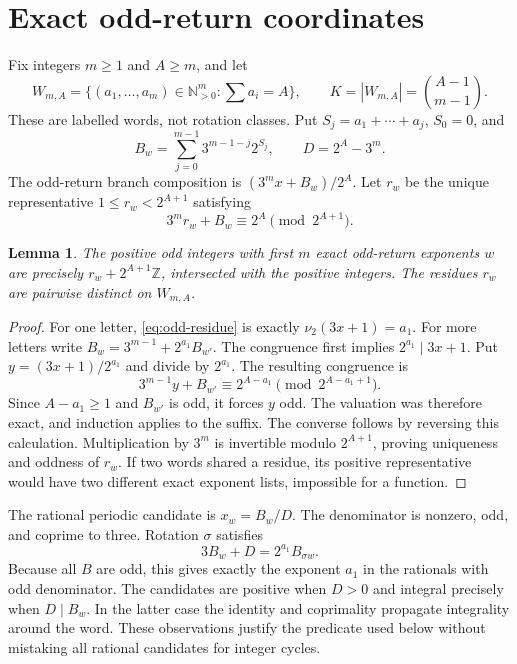 \documentclass[11pt]{amsart}
\newtheorem{lemma}[theorem]{Lemma}
\theoremstyle{remark}\newtheorem{remark}[theorem]{Remark}
\newcommand{\Z}{\mathbb Z}
\newcommand{\N}{\mathbb N}
\begin{document}
\section{Exact odd-return coordinates}
Fix integers $m\ge1$ and $A\ge m$, and let
\[
 W_{m,A}=\{(a_1,\ldots,a_m)\in\N_{>0}^m:\textstyle\sum a_i=A\},
 \qquad K=|W_{m,A}|=\binom{A-1}{m-1}.
\]
These are labelled words, not rotation classes. Put $S_j=a_1+\cdots+a_j$,
$S_0=0$, and
\[
 B_w=\sum_{j=0}^{m-1}3^{m-1-j}2^{S_j},\qquad D=2^A-3^m.
\]
The odd-return branch composition is $(3^m x+B_w)/2^A$.
Let $r_w$ be the unique representative $1\le r_w<2^{A+1}$ satisfying
\begin{equation}\label{eq:odd-residue}
 3^m r_w+B_w\equiv2^A\pmod{2^{A+1}}.
\end{equation}

\begin{lemma}\label{lem:odd}
The positive odd integers with first $m$ exact odd-return exponents $w$
are precisely $r_w+2^{A+1}\Z$, intersected with the positive integers.
The residues $r_w$ are pairwise distinct on $W_{m,A}$.
\end{lemma}
\begin{proof}
For one letter, \eqref{eq:odd-residue} is exactly
$\nu_2(3x+1)=a_1$. For more letters write
$B_w=3^{m-1}+2^{a_1}B_{w'}$. The congruence first implies
$2^{a_1}\mid3x+1$. Put $y=(3x+1)/2^{a_1}$ and divide by $2^{a_1}$.
The resulting congruence is
\[
 3^{m-1}y+B_{w'}\equiv2^{A-a_1}\pmod{2^{A-a_1+1}}.
\]
Since $A-a_1\ge1$ and $B_{w'}$ is odd, it forces $y$ odd. The
valuation was therefore exact, and induction applies to the suffix.
The converse follows by reversing this calculation. Multiplication by
$3^m$ is invertible modulo $2^{A+1}$, proving uniqueness and oddness
of $r_w$. If two words shared a residue, its positive representative
would have two different exact exponent lists, impossible for a function.
\end{proof}

The rational periodic candidate is $x_w=B_w/D$. The denominator is
nonzero, odd, and coprime to three. Rotation $\sigma$ satisfies
\[
 3B_w+D=2^{a_1}B_{\sigma w}.
\]
Because all $B$ are odd, this gives exactly the exponent $a_1$ in
the rationals with odd denominator. The candidates are positive when
$D>0$ and integral precisely when $D\mid B_w$. In the latter case
the identity and coprimality propagate integrality around the word.
These observations justify the predicate used below without mistaking
all rational candidates for integer cycles.
\end{document}

